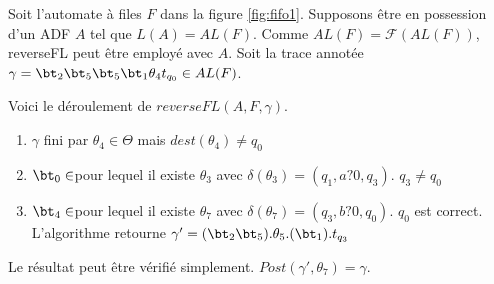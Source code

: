Soit l'automate à files $F$ dans la figure \ref{fig:fifo1}. Supposons être en possession d'un ADF $A$ tel que $L(A)=AL(F)$.
Comme $AL(F)=\mathcal{F}(AL(F))$, reverseFL peut être employé avec $A$.
Soit la trace annotée $\gamma=\bt_2\bt_5\bt_5\bt_1\theta_4 t_{q_0} \in AL(F)$.

Voici le déroulement de $reverseFL(A,F,\gamma)$.

\begin{enumerate}
  \item $\gamma$ fini par $\theta_4\in\Theta$ mais $dest(\theta_4)\neq q_0$
  \item $\bt_0\in$\barTheta pour lequel il existe $\theta_3$ avec $\delta(\theta_3)=(q_1,a?0,q_3)$. $q_3\neq q_0$
  \item $\bt_4\in$\barTheta pour lequel il existe $\theta_7$ avec $\delta(\theta_7)=(q_3,b?0,q_0)$. $q_0$ est correct. L'algorithme retourne $\gamma'=(\bt_2\bt_5).\theta_5.(\bt_1).t_{q_3}$
\end{enumerate}

Le résultat peut être vérifié simplement. $Post(\gamma',\theta_7)=\gamma$.
